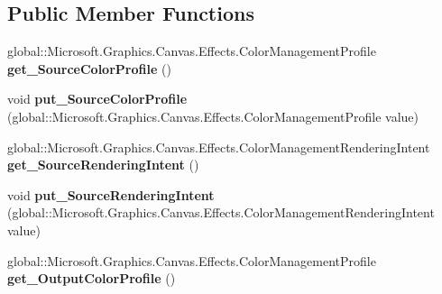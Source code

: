 \subsection*{Public Member Functions}
\begin{DoxyCompactItemize}
\item 
\mbox{\label{interface_microsoft_1_1_graphics_1_1_canvas_1_1_effects_1_1_i_color_management_effect_ab5d6882071f30c0d22c6206687b4b83b}} 
global\+::\+Microsoft.\+Graphics.\+Canvas.\+Effects.\+Color\+Management\+Profile {\bfseries get\+\_\+\+Source\+Color\+Profile} ()
\item 
\mbox{\label{interface_microsoft_1_1_graphics_1_1_canvas_1_1_effects_1_1_i_color_management_effect_aa757b92037b6dabd9bf623a16c5dd4e6}} 
void {\bfseries put\+\_\+\+Source\+Color\+Profile} (global\+::\+Microsoft.\+Graphics.\+Canvas.\+Effects.\+Color\+Management\+Profile value)
\item 
\mbox{\label{interface_microsoft_1_1_graphics_1_1_canvas_1_1_effects_1_1_i_color_management_effect_aa7388e8ab03296386d33f1faf0617131}} 
global\+::\+Microsoft.\+Graphics.\+Canvas.\+Effects.\+Color\+Management\+Rendering\+Intent {\bfseries get\+\_\+\+Source\+Rendering\+Intent} ()
\item 
\mbox{\label{interface_microsoft_1_1_graphics_1_1_canvas_1_1_effects_1_1_i_color_management_effect_aa7e9dbcbb6bca52b58c9c59dea51a272}} 
void {\bfseries put\+\_\+\+Source\+Rendering\+Intent} (global\+::\+Microsoft.\+Graphics.\+Canvas.\+Effects.\+Color\+Management\+Rendering\+Intent value)
\item 
\mbox{\label{interface_microsoft_1_1_graphics_1_1_canvas_1_1_effects_1_1_i_color_management_effect_a6fac8f330f6ff6d98ef14cef1e6f5663}} 
global\+::\+Microsoft.\+Graphics.\+Canvas.\+Effects.\+Color\+Management\+Profile {\bfseries get\+\_\+\+Output\+Color\+Profile} ()
\item 
\mbox{\label{interface_microsoft_1_1_graphics_1_1_canvas_1_1_effects_1_1_i_color_management_effect_a9dd341e021ce085924bf27decaeaaf6e}} 

\end{DoxyCompactItemize}
